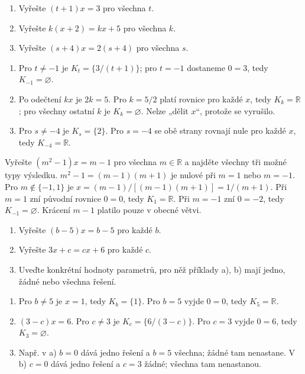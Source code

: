 \documentclass[11pt,a4paper]{article}
\begin{document}
\begin{zadaniReseniBox}
\begin{enumerate}[label=\alph*)]
\item Vyřešte $(t+1)x=3$ pro všechna $t$.
\item Vyřešte $k(x+2)=kx+5$ pro všechna $k$.
\item Vyřešte $(s+4)x=2(s+4)$ pro všechna $s$.
\end{enumerate}
\tcblower
\begin{enumerate}[label=\alph*)]
\item Pro $t\ne-1$ je $K_t=\{3/(t+1)\}$; pro $t=-1$ dostaneme $0=3$, tedy $K_{-1}=\varnothing$.
\item Po odečtení $kx$ je $2k=5$. Pro $k=5/2$ platí rovnice pro každé $x$, tedy $K_k=\mathbb R$; pro všechny ostatní $k$ je $K_k=\varnothing$. Nelze „dělit $x$“, protože se vyrušilo.
\item Pro $s\ne-4$ je $K_s=\{2\}$. Pro $s=-4$ se obě strany rovnají nule pro každé $x$, tedy $K_{-4}=\mathbb R$.
\end{enumerate}
\end{zadaniReseniBox}
\begin{zadaniReseniBox}
Vyřešte $(m^2-1)x=m-1$ pro všechna $m\in\mathbb R$ a najděte všechny tři možné typy výsledku.
\tcblower
$m^2-1=(m-1)(m+1)$ je nulové při $m=1$ nebo $m=-1$. Pro $m\notin\{-1,1\}$ je $x=(m-1)/[(m-1)(m+1)]=1/(m+1)$. Při $m=1$ zní původní rovnice $0=0$, tedy $K_1=\mathbb R$. Při $m=-1$ zní $0=-2$, tedy $K_{-1}=\varnothing$. Krácení $m-1$ platilo pouze v obecné větvi.
\end{zadaniReseniBox}
\begin{zadaniReseniBox}
\begin{enumerate}[label=\alph*)]
\item Vyřešte $(b-5)x=b-5$ pro každé $b$.
\item Vyřešte $3x+c=cx+6$ pro každé $c$.
\item Uveďte konkrétní hodnoty parametrů, pro něž příklady a), b) mají jedno, žádné nebo všechna řešení.
\end{enumerate}
\tcblower
\begin{enumerate}[label=\alph*)]
\item Pro $b\ne5$ je $x=1$, tedy $K_b=\{1\}$. Pro $b=5$ vyjde $0=0$, tedy $K_5=\mathbb R$.
\item $(3-c)x=6$. Pro $c\ne3$ je $K_c=\{6/(3-c)\}$. Pro $c=3$ vyjde $0=6$, tedy $K_3=\varnothing$.
\item Např. v a) $b=0$ dává jedno řešení a $b=5$ všechna; žádné tam nenastane. V b) $c=0$ dává jedno řešení a $c=3$ žádné; všechna tam nenastanou.
\end{enumerate}
\end{zadaniReseniBox}
\end{document}

